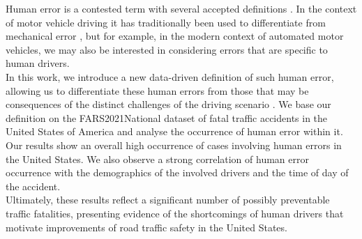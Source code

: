 \documentclass{article}
\theoremstyle{plain}
\theoremstyle{definition}
\theoremstyle{remark}
\begin{document}
Human error is a contested term with several accepted definitions \citep{reason2000human, woods2017behind, strauch2017investigating}. In the context of motor vehicle driving it has traditionally been used to differentiate from mechanical error \citep{stanton2009human}, but for example, in the modern context of automated motor vehicles, we may also be interested in considering errors that are specific to human drivers.
\\
In this work, we introduce a new data-driven definition of such human error, allowing us to differentiate these human errors from those that may be consequences of the distinct challenges of the driving scenario \citep{guanetti2018control}. We base our definition on the FARS2021National dataset \citep{fars} of fatal traffic accidents in the United States of America and analyse the occurrence of human error within it. 
\\
Our results show an overall high occurrence of cases involving human errors in the United States. We also observe a strong correlation of human error occurrence with the demographics of the involved drivers and the time of day of the accident.
\\
Ultimately, these results reflect a significant number of possibly preventable traffic fatalities, presenting evidence of the shortcomings of human drivers that motivate improvements of road traffic safety in the United States.


\end{document}
